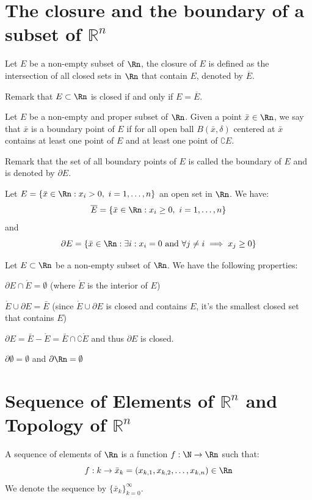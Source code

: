 \section{The closure and the boundary of a subset of $\mathbb{R}^n$}
\begin{definition}[Closure]
    Let $E$ be a non-empty subset of $\Rn$, the closure of $E$ is defined as the intersection of all closed sets in $\Rn$ that contain $E$, denoted by $\overline{E}$.
\end{definition}
Remark that $E \subset \Rn$ is closed if and only if $E = \overline{E}$.

\begin{definition}[Boundary]
    Let $E$ be a non-empty and proper subset of $\Rn$. Given a point $\bar{x} \in \Rn$, we say that $\bar{x}$ is a boundary point of $E$ if for all open ball $B(\bar{x}, \delta)$ centered at $\bar{x}$ contains at least one point of $E$ and at least one point of $\complement E$.
\end{definition}
Remark that the set of all boundary points of $E$ is called the boundary of $E$ and is denoted by $\partial E$.

\begin{eg}
    Let $E = \{\bar{x} \in \Rn : x_i > 0, \ i = 1, \ldots, n\}$ an open set in $\Rn$. We have:
    \[
        \overline{E} = \{\bar{x} \in \Rn : x_i \geq 0, \ i = 1, \ldots, n\}
    \]
    and
    \[
        \partial E = \{\bar{x} \in \Rn : \exists i : x_i = 0 \text{ and } \forall j \neq i \implies x_j \geq 0\}
    \]
\end{eg}
Let $E \subset \Rn$ be a non-empty subset of $\Rn$. We have the following properties:
\begin{citemize}
    \item $\partial E \cap \mathring{E} = \emptyset$ (where $\mathring{E}$ is the interior of $E$)
    \item $\mathring{E} \cup \partial E = \bar{E}$ (since $\mathring{E} \cup \partial E$ is closed and contains $E$, it's the smallest closed set that contains $E$)
    \item $\partial E = \bar{E} - \mathring{E} = \bar{E} \cap \complement \mathring{E}$ and thus $\partial E$ is closed.
    \item $\partial \emptyset = \emptyset$ and $\partial \Rn = \emptyset$
\end{citemize}

\section{Sequence of Elements of $\mathbb{R}^n$ and Topology of $\mathbb{R}^n$}
\begin{definition}
    A sequence of elements of $\Rn$ is a function $f : \N \to \Rn$ such that:
    \[  
        f: k \to \bar{x}_k = (x_{k,1}, x_{k,2}, \ldots, x_{k,n} ) \in \Rn
    \]
    We denote the sequence by $\{\bar{x}_k\}_{k = 0}^{\infty}$.
\end{definition}

